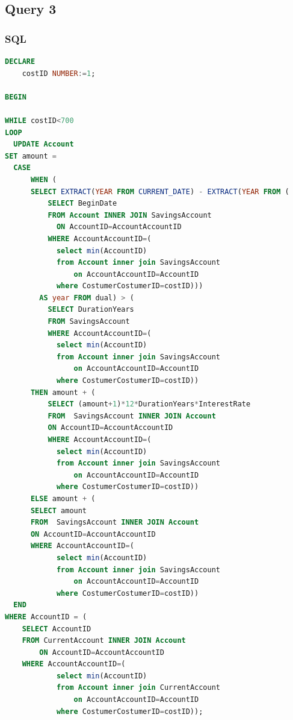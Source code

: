 \documentclass[a4paper, 10pt]{article}
\begin{document}
\subsection{Query 3}
\subsubsection{SQL}
\begin{lstlisting}[language=SQL]
DECLARE 
    costID NUMBER:=1;
    
BEGIN

WHILE costID<700
LOOP
  UPDATE Account 
SET amount =     
  CASE          
      WHEN (
      SELECT EXTRACT(YEAR FROM CURRENT_DATE) - EXTRACT(YEAR FROM (
          SELECT BeginDate 
          FROM Account INNER JOIN SavingsAccount 
            ON AccountID=AccountAccountID 
          WHERE AccountAccountID=(
            select min(AccountID) 
            from Account inner join SavingsAccount 
                on AccountAccountID=AccountID 
            where CostumerCostumerID=costID)))
        AS year FROM dual) > (
          SELECT DurationYears 
          FROM SavingsAccount 
          WHERE AccountAccountID=(
            select min(AccountID) 
            from Account inner join SavingsAccount 
                on AccountAccountID=AccountID 
            where CostumerCostumerID=costID))
      THEN amount + ( 
          SELECT (amount+1)*12*DurationYears*InterestRate 
          FROM  SavingsAccount INNER JOIN Account 
          ON AccountID=AccountAccountID 
          WHERE AccountAccountID=(
            select min(AccountID) 
            from Account inner join SavingsAccount 
                on AccountAccountID=AccountID 
            where CostumerCostumerID=costID))   
      ELSE amount + ( 
      SELECT amount 
      FROM  SavingsAccount INNER JOIN Account 
      ON AccountID=AccountAccountID 
      WHERE AccountAccountID=(
            select min(AccountID) 
            from Account inner join SavingsAccount 
                on AccountAccountID=AccountID 
            where CostumerCostumerID=costID)) 
  END 
WHERE AccountID = (
    SELECT AccountID 
    FROM CurrentAccount INNER JOIN Account 
        ON AccountID=AccountAccountID 
    WHERE AccountAccountID=(
            select min(AccountID) 
            from Account inner join CurrentAccount 
                on AccountAccountID=AccountID 
            where CostumerCostumerID=costID));


\end{lstlisting}
\end{document}
